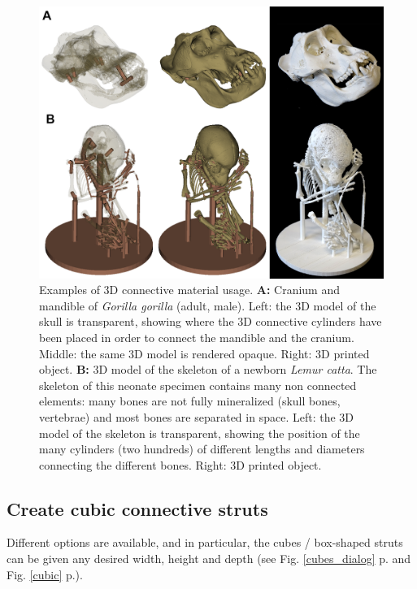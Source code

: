 \begin{figure}
  \centering
  \includegraphics[scale=1.40]{images/09/create_3D_primitives/support_example.png} 
	\caption{Examples of 3D connective material usage. \textbf{A:} Cranium and mandible of \textit{Gorilla gorilla} (adult, male). Left: the 3D model of the skull is transparent, showing where the 3D connective cylinders have been placed in order to connect the mandible and the cranium. Middle: the same 3D model is rendered opaque. Right: 3D printed object. \textbf{B:} 3D model of the skeleton of a newborn \textit{Lemur catta}. The skeleton of this neonate specimen contains many non connected elements: many bones are not fully mineralized (skull bones, vertebrae) and most bones are separated in space. Left: the 3D model of the skeleton is transparent, showing the position of the many cylinders (two hundreds) of different lengths and diameters connecting the different bones. Right: 3D printed object. }
 \label{support_example}
\end{figure}

\subsection{Create cubic connective struts}
Different options are available, and in particular, the cubes / box-shaped struts can be given any desired width, height and depth (see Fig.  \ref{cubes_dialog} p.\pageref{cubes_dialog} and Fig. \ref{cubic} p.\pageref{cubic}). 

